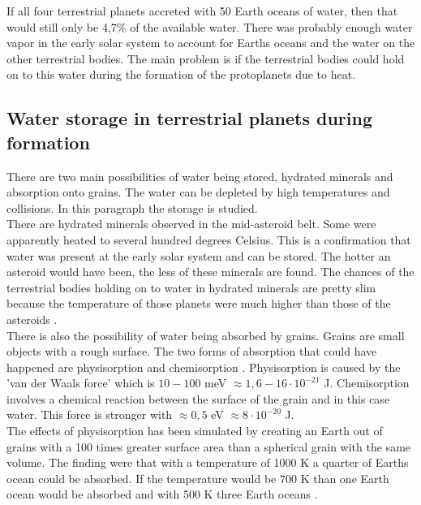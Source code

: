 If all four terrestrial planets accreted with 50 Earth oceans of water, then that would still only be 4,7\% of the available water. There was probably enough water vapor in the early solar system to account for Earths oceans and the water on the other terrestrial bodies. The main problem is if the terrestrial bodies could hold on to this water during the formation of the protoplanets due to heat.


\subsection{Water storage in terrestrial planets during formation}
There are two main possibilities of water being stored, hydrated minerals and absorption onto grains. The water can be depleted by high temperatures and collisions. In this paragraph the storage is studied. \\

There are hydrated minerals observed in the mid-asteroid belt. Some were apparently heated to several hundred degrees Celsius. This is a confirmation that water was present at the early solar system and can be stored. The hotter an asteroid would have been, the less of these minerals are found. The chances of the terrestrial bodies holding on to water in hydrated minerals are pretty slim because the temperature of those planets were much higher than those of the asteroids \cite{TPRivkin}.\\

There is also the possibility of water being absorbed by grains. Grains are small objects with a rough surface. The two forms of absorption that could have happened are physisorption and chemisorption \cite[p.~523]{TPoriginWater}. Physisorption is caused by the 'van der Waals force' which is $10 - 100$ meV $\approx 1,6 - 16 \cdot 10^{-21}$ J. Chemisorption involves a chemical reaction between the surface of the grain and in this case water. This force is stronger with $\approx 0,5$ eV $\approx 8 \cdot 10^{-20}$ J.\\

The effects of physisorption has been simulated by creating an Earth out of grains with a 100 times greater surface area than a spherical grain with the same volume. The finding were that with a temperature of 1000 K a quarter of Earths ocean could be absorbed. If the temperature would be 700 K than one Earth ocean would be absorbed and with 500 K three Earth oceans \cite{TPStimpf1} \cite{TPStimpf2}.\\

